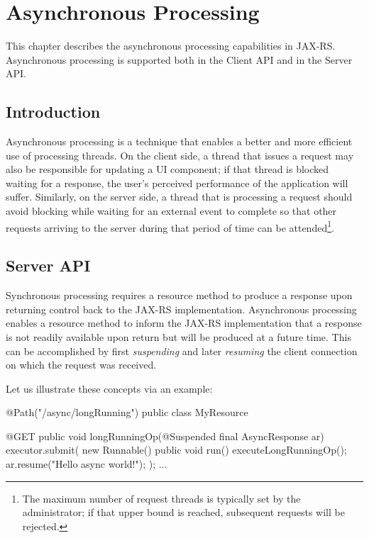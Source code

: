 \chapter{Asynchronous Processing}
\label{asynchronous_processing}

This chapter describes the asynchronous processing capabilities in JAX-RS. Asynchronous processing is supported both in the Client API and in the Server API.

\section{Introduction}
\label{introduction_async}

Asynchronous processing is a technique that enables a better and more efficient use of processing threads. On the client side, a thread that issues a request may also be responsible for updating a UI component; if that thread is blocked waiting for a response, the user's perceived performance of the application will suffer. Similarly, on the server side, a thread that is processing a request should avoid blocking while waiting for an external event to complete so that other requests arriving to the server during that period of time can be attended\footnote{The maximum number of request threads is typically set by the administrator; if that upper bound is reached, subsequent requests will be rejected.}.

\section{Server API}
\label{server_api}

Synchronous processing requires a resource method to produce a response upon returning control back to the JAX-RS implementation. Asynchronous processing enables a resource method to inform the JAX-RS implementation that a response is not readily available upon return but will be produced at a future time. This can be accomplished by first {\em suspending} and later {\em resuming} the client connection on which the request was received. 

Let us illustrate these concepts via an example:

\begin{listing}{1}
@Path("/async/longRunning")
public class MyResource {
    
    @GET
    public void longRunningOp(@Suspended final AsyncResponse ar) {
        executor.submit(
            new Runnable() {
                public void run() {
                    executeLongRunningOp();
                    ar.resume("Hello async world!");
        } });
    } 
    ...
}
\end{listing}


